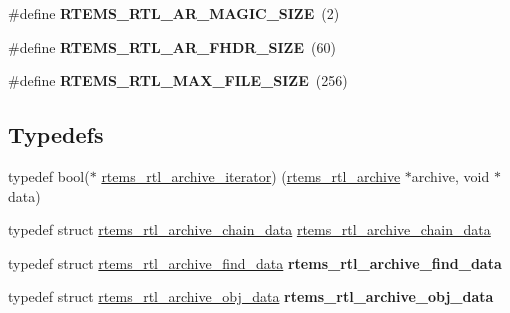 \begin{DoxyCompactItemize}
\mbox{\label{rtl-archive_8c_ab3996b02b8e1f3772c87bf1bc4a8117f}} 
\#define {\bfseries R\+T\+E\+M\+S\+\_\+\+R\+T\+L\+\_\+\+A\+R\+\_\+\+M\+A\+G\+I\+C\+\_\+\+S\+I\+ZE}~(2)
\item 
\mbox{\label{rtl-archive_8c_a401fa1240565d53aab76de4fc1f406a2}} 
\#define {\bfseries R\+T\+E\+M\+S\+\_\+\+R\+T\+L\+\_\+\+A\+R\+\_\+\+F\+H\+D\+R\+\_\+\+S\+I\+ZE}~(60)
\item 
\mbox{\label{rtl-archive_8c_ae3783462b379eeab8e8829f70d846ae2}} 
\#define {\bfseries R\+T\+E\+M\+S\+\_\+\+R\+T\+L\+\_\+\+M\+A\+X\+\_\+\+F\+I\+L\+E\+\_\+\+S\+I\+ZE}~(256)
\end{DoxyCompactItemize}
\subsection*{Typedefs}
\begin{DoxyCompactItemize}
\item 
typedef bool($\ast$ \mbox{\hyperlink{rtl-archive_8c_a7f654505aadef94dfaca10b5cce047e4}{rtems\+\_\+rtl\+\_\+archive\+\_\+iterator}}) (\mbox{\hyperlink{structrtems__rtl__archive}{rtems\+\_\+rtl\+\_\+archive}} $\ast$archive, void $\ast$data)
\item 
typedef struct \mbox{\hyperlink{structrtems__rtl__archive__chain__data}{rtems\+\_\+rtl\+\_\+archive\+\_\+chain\+\_\+data}} \mbox{\hyperlink{rtl-archive_8c_a8104f59b72abc78fe651d276082bfcfd}{rtems\+\_\+rtl\+\_\+archive\+\_\+chain\+\_\+data}}
\item 
\mbox{\label{rtl-archive_8c_a31ab71c51ed6ebfa22cf6eb118826fa3}} 
typedef struct \mbox{\hyperlink{structrtems__rtl__archive__find__data}{rtems\+\_\+rtl\+\_\+archive\+\_\+find\+\_\+data}} {\bfseries rtems\+\_\+rtl\+\_\+archive\+\_\+find\+\_\+data}
\item 
\mbox{\label{rtl-archive_8c_a004ab254ee9e587ebedfc399b72ad3da}} 
typedef struct \mbox{\hyperlink{structrtems__rtl__archive__obj__data}{rtems\+\_\+rtl\+\_\+archive\+\_\+obj\+\_\+data}} {\bfseries rtems\+\_\+rtl\+\_\+archive\+\_\+obj\+\_\+data}
\end{DoxyCompactItemize}
